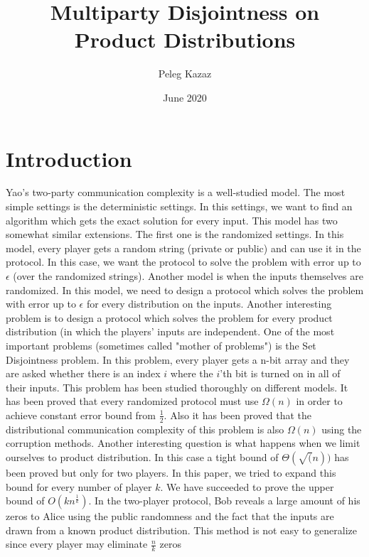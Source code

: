 \documentclass{article}
\title{Multiparty Disjointness on Product Distributions}
\author{Peleg Kazaz}
\date{June 2020}
\theoremstyle{plain}
\begin{document}
\maketitle


\section{Introduction}
Yao's two-party communication complexity is a well-studied model. The most simple settings is the deterministic settings. In this settings, we want to find an algorithm which gets the exact solution for every input. This model has two somewhat similar extensions. The first one is the randomized settings. In this model, every player gets a random string (private or public) and can use it in the protocol. In this case, we want the protocol to solve the problem with error up to $\epsilon$ (over the randomized strings). \newline
Another model is when the inputs themselves are randomized. In this model, we need to design a protocol which solves the problem with error up to $\epsilon$ for every distribution on the inputs. Another interesting problem is to design a protocol which solves the problem for every product distribution (in which the players' inputs are independent. \newline
One of the most important problems (sometimes called "mother of problems") is the Set Disjointness problem. In this problem, every player gets a n-bit array and they are asked whether there is an index $i$ where the $i$'th bit is turned on in all of their inputs. \newline
This problem has been studied thoroughly on different models. It has been proved that every randomized protocol must use $\Omega(n)$ in order to achieve constant error bound from $\frac{1}{2}$.  Also it has been proved that the distributional communication complexity of this problem is also $\Omega(n)$ using the corruption methods. Another interesting question is what happens when we limit ourselves to product distribution. In this case a tight bound of $\Theta(\sqrt(n))$ has been proved but only for two players. \newline
In this paper, we tried to expand this bound for every number of player $k$. We have succeeded to prove the upper bound of $O(kn^{\frac{1}{k}})$. 
In the two-player protocol, Bob reveals a large amount of his zeros to Alice using the public randomness and the fact that the inputs are drawn from a known product distribution. This method is not easy to generalize since every player may eliminate $\frac{n}{k}$ zeros 
\end{document}
